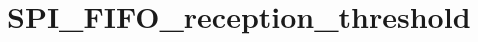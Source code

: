 \hypertarget{group___s_p_i___f_i_f_o__reception__threshold}{\section{S\-P\-I\-\_\-\-F\-I\-F\-O\-\_\-reception\-\_\-threshold}
\label{group___s_p_i___f_i_f_o__reception__threshold}
}
